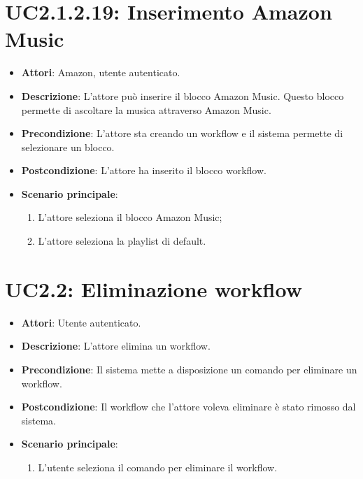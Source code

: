 \section{UC2.1.2.19: Inserimento Amazon Music}
\label{UC2.1.2.19}
\begin{itemize}
	\item \textbf{Attori}: Amazon, utente autenticato.
	\item \textbf{Descrizione}: L'attore può inserire il blocco Amazon Music. Questo blocco permette di ascoltare la musica attraverso Amazon Music.
	\item \textbf{Precondizione}: L'attore sta creando un workflow e il sistema permette di selezionare un blocco.	
	\item \textbf{Postcondizione}: L'attore ha inserito il blocco workflow.
	\item \textbf{Scenario principale}:
	\begin{enumerate} \item L'attore seleziona il blocco Amazon Music;  \item  L'attore seleziona la playlist di default.\end{enumerate}
\end{itemize}

\section{UC2.2: Eliminazione workflow}
\label{UC2.2}
\begin{itemize}
	\item \textbf{Attori}: Utente autenticato.
	\item \textbf{Descrizione}: L'attore elimina un workflow.
	\item \textbf{Precondizione}: Il sistema mette a disposizione un comando per eliminare un workflow.
	\item \textbf{Postcondizione}: Il workflow che l'attore voleva eliminare è stato rimosso dal sistema.
	\item \textbf{Scenario principale}:
	\begin{enumerate} \item L'utente seleziona il comando per eliminare il workflow.\end{enumerate}
\end{itemize}

